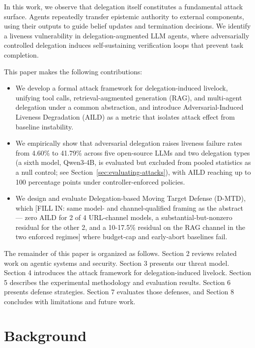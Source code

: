 \documentclass[conference]{IEEEtran}
\begin{document}
In this work, we observe that delegation itself constitutes a fundamental attack surface. Agents repeatedly transfer epistemic authority to external components, using their outputs to guide belief updates and termination decisions. We identify a liveness vulnerability in delegation-augmented LLM agents, where adversarially controlled delegation induces self-sustaining verification loops that prevent task completion.

This paper makes the following contributions:

\begin{itemize}
\item We develop a formal attack framework for delegation-induced livelock, unifying tool calls, retrieval-augmented generation (RAG), and multi-agent delegation under a common abstraction, and introduce Adversarial-Induced Liveness Degradation (AILD) as a metric that isolates attack effect from baseline instability.

\item We empirically show that adversarial delegation raises liveness failure rates from 4.60\% to 41.79\% across five open-source LLMs and two delegation types (a sixth model, Qwen3-4B, is evaluated but excluded from pooled statistics as a null control; see Section~\ref{sec:evaluating-attacks}), with AILD reaching up to 100 percentage points under controller-enforced policies.

\item We design and evaluate Delegation-based Moving Target Defense (D-MTD), which [FILL IN: same model- and channel-qualified framing as the abstract — zero AILD for 2 of 4 URL-channel models, a substantial-but-nonzero residual for the other 2, and a 10-17.5\% residual on the RAG channel in the two enforced regimes] where budget-cap and early-abort baselines fail.
\end{itemize}

The remainder of this paper is organized as follows. Section 2 reviews related work on agentic systems and security. Section 3 presents our threat model. Section 4 introduces the attack framework for delegation-induced livelock. Section 5 describes the experimental methodology and evaluation results. Section 6 presents defense strategies. Section 7 evaluates those defenses, and Section 8 concludes with limitations and future work.

\section{Background}
\end{document}
